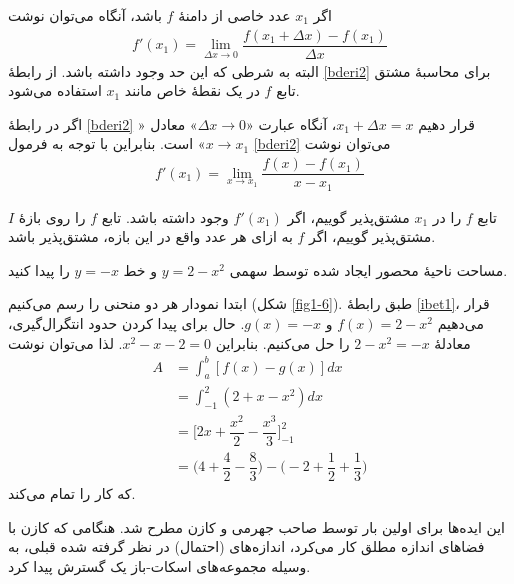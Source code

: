 \begin{premind}
اگر $x_1$ عدد خاصی از دامنهٔ $f$ باشد، آنگاه می‌توان نوشت
\begin{align}\label{bderi2}
f'(x_1)=\lim_{\Delta x\rightarrow 0}\dfrac{f(x_1+\Delta x) - f(x_1)}{\Delta x}
\end{align}
البته به شرطی که این حد وجود داشته باشد. از رابطهٔ \eqref{bderi2} برای محاسبهٔ مشتق تابع $f$ در یک نقطهٔ 
خاص مانند $x_1$ استفاده می‌شود. 

اگر در رابطهٔ \eqref{bderi2} قرار دهیم $x_1+\Delta x=x$، آنگاه عبارت
 «$\Delta x\rightarrow 0$» 
معادل «$x\rightarrow x_1$»
است. بنابراین با توجه به فرمول \eqref{bderi2} می‌توان نوشت
\begin{align*}
f'(x_1)=\lim_{ x\rightarrow x_1}\dfrac{f(x) - f(x_1)}{x-x_1}
\end{align*}

تابع $f$ را در $x_1$ مشتق‌پذیر گوییم، اگر $f'(x_1)$ وجود داشته باشد.
تابع $f$ را روی بازهٔ $I$ مشتق‌پذیر گوییم، اگر $f$ به ازای هر عدد واقع در این بازه، مشتق‌پذیر باشد.
\end{premind}
\begin{example}
مساحت ناحیهٔ محصور ایجاد شده توسط سهمی $y=2-x^2$ و خط $y=-x$ را پیدا
کنید.
\end{example}

\begin{solution}
ابتدا نمودار هر دو منحنی را رسم می‌کنیم (شکل \ref{fig1-6}). 
 طبق رابطهٔ \eqref{ibet1}، قرار می‌دهیم
$f(x)=2-x^2$
و
$g(x)=-x$.
حال برای پیدا کردن حدود انتگرال‌گیری، معادلهٔ $2-x^2=-x$ را حل می‌کنیم. بنابراین
$x^2-x-2=0$.
لذا
 می‌توان نوشت
\begin{align*}
A&=\int_a^b [f(x)-g(x)]dx\\[2mm]
&=\int_{-1}^{2}(2+x-x^2)dx\\[2mm]
&=\Bigg[2x+\dfrac{x^2}{2}-\dfrac{x^3}{3}\Bigg]_{-1}^{2}\\[2mm]
&=\Big(4+\dfrac{4}{2}-\dfrac{8}{3}\Big)-\Big(-2+\dfrac{1}{2}+\dfrac{1}{3}\Big)%
\end{align*}
که کار را تمام می‌کند.
\end{solution}
\threecolumnfootnotes
این ایده‌ها برای اولین بار توسط صاحب ‌جهرمی و کازن
مطرح شد. هنگامی که کازن با فضاهای اندازه مطلق کار می‌کرد، اندازه‌های (احتمال) در نظر گرفته شده قبلی، به وسیله مجموعه‌های اسکات-باز یک  گسترش پیدا کرد.

